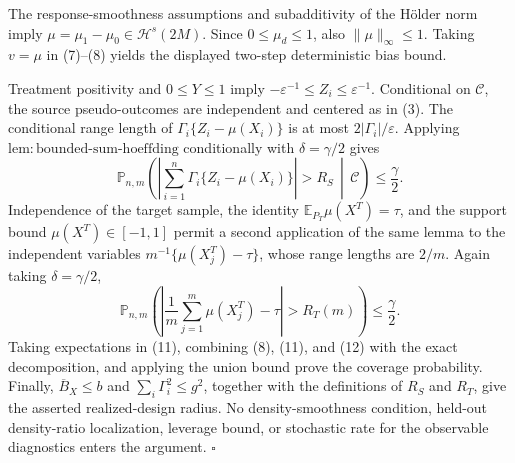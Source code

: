 The response-smoothness assumptions and subadditivity of the H\"older norm imply \(\mu=\mu_1-\mu_0\in\mathcal H^s(2M)\). Since \(0\le\mu_d\le1\), also \(\|\mu\|_\infty\le1\). Taking \(v=\mu\) in (7)--(8) yields the displayed two-step deterministic bias bound.

Treatment positivity and \(0\le Y\le1\) imply \(-\varepsilon^{-1}\le Z_i\le\varepsilon^{-1}\). Conditional on \(\mathcal C\), the source pseudo-outcomes are independent and centered as in (3). The conditional range length of \(\Gamma_i\{Z_i-\mu(X_i)\}\) is at most \(2|\Gamma_i|/\varepsilon\). Applying \(\mathrm{lem:bounded\text{-}sum\text{-}hoeffding}\) conditionally with \(\delta=\gamma/2\) gives
\[
\mathbb P_{n,m}\!\left(
\left|\sum_{i=1}^n\Gamma_i\{Z_i-\mu(X_i)\}\right|>R_S
\,\middle|\,\mathcal C\right)\le\frac\gamma2.
\tag{11}
\]
Independence of the target sample, the identity \(\mathbb E_{P_T}\mu(X^T)=\tau\), and the support bound \(\mu(X^T)\in[-1,1]\) permit a second application of the same lemma to the independent variables \(m^{-1}\{\mu(X_j^T)-\tau\}\), whose range lengths are \(2/m\). Again taking \(\delta=\gamma/2\),
\[
\mathbb P_{n,m}\!\left(
\left|\frac1m\sum_{j=1}^m\mu(X_j^T)-\tau\right|>R_T(m)
\right)\le\frac\gamma2.
\tag{12}
\]
Taking expectations in (11), combining (8), (11), and (12) with the exact decomposition, and applying the union bound prove the coverage probability. Finally, \(\overline B_X\le b\) and \(\sum_i\Gamma_i^2\le g^2\), together with the definitions of \(R_S\) and \(R_T\), give the asserted realized-design radius. No density-smoothness condition, held-out density-ratio localization, leverage bound, or stochastic rate for the observable diagnostics enters the argument. \(\square\)